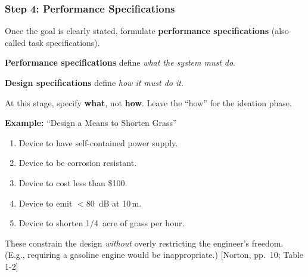 \documentclass[10pt,aspectratio=43]{beamer}
\newcommand{\pref}[1]{\vfill\hfill{\scriptsize\color{gray}[Norton, pp.~#1]}}
\begin{document}
\begin{frame}
\frametitle{Step 4: Performance Specifications}

Once the goal is clearly stated, formulate \textbf{performance specifications} (also called task specifications).

\begin{yellowbox}
\textbf{Performance specifications} define \emph{what the system must do}.

\textbf{Design specifications} define \emph{how it must do it}.

At this stage, specify \textbf{what}, not \textbf{how}. Leave the ``how'' for the ideation phase.
\end{yellowbox}

\vspace{6pt}
\textbf{Example:} ``Design a Means to Shorten Grass''
\begin{enumerate}
  \item Device to have self-contained power supply.
  \item Device to be corrosion resistant.
  \item Device to cost less than \$100.
  \item Device to emit $<80$~dB at 10\,m.
  \item Device to shorten 1/4~acre of grass per hour.
\end{enumerate}

\vspace{4pt}
These constrain the design \emph{without} overly restricting the engineer's freedom. (E.g., requiring a gasoline engine would be inappropriate.)
\pref{10; Table 1-2}
\end{frame}
\end{document}
